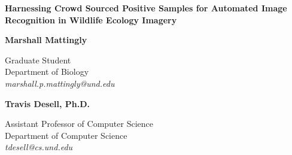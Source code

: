 \documentclass[11pt]{article}
\begin{document}
\pagestyle{empty}
\renewcommand{\thesection}{\Alph{section}}

\setlength{\parsep}{5pt}
\setlength{\parskip}{5pt plus 2pt minus 1pt}

\noindent
{\large\bf Harnessing Crowd Sourced Positive Samples for Automated Image Recognition in Wildlife Ecology Imagery}

\begin{center}
\begin{minipage}{0.53\linewidth}
\begin{center}
{\bf Marshall Mattingly}\\
\begin{small}
Graduate Student\\
Department of Biology\\
{\it marshall.p.mattingly@und.edu}
\end{small}
\end{center}
\end{minipage}
\begin{minipage}{0.43\linewidth}
\begin{center}
{\bf Travis Desell, Ph.D.}\\
\begin{small}
Assistant Professor of Computer Science\\
Department of Computer Science\\
{\it tdesell@cs.und.edu}
\end{small}
\end{center}
\end{minipage}
\end{center}
\end{document}
